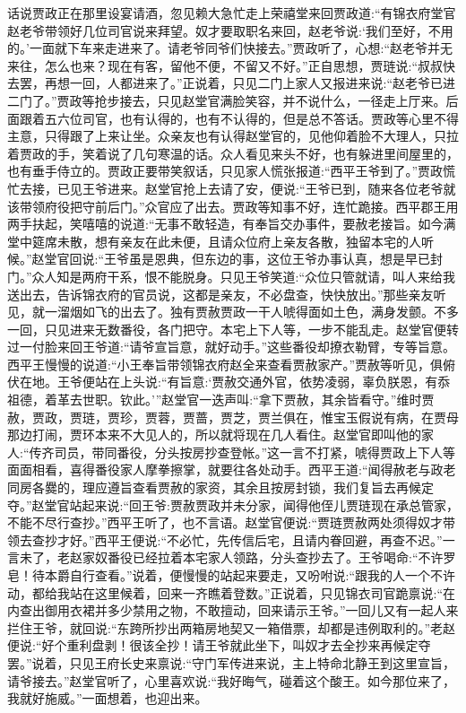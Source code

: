 


\begin{parag}
    话说贾政正在那里设宴请酒，忽见赖大急忙走上荣禧堂来回贾政道:“有锦衣府堂官赵老爷带领好几位司官说来拜望。奴才要取职名来回，赵老爷说:‘我们至好，不用的。’一面就下车来走进来了。请老爷同爷们快接去。”贾政听了，心想:“赵老爷并无来往，怎么也来？现在有客，留他不便，不留又不好。”正自思想，贾琏说:“叔叔快去罢，再想一回，人都进来了。”正说着，只见二门上家人又报进来说:“赵老爷已进二门了。”贾政等抢步接去，只见赵堂官满脸笑容，并不说什么，一径走上厅来。后面跟着五六位司官，也有认得的，也有不认得的，但是总不答话。贾政等心里不得主意，只得跟了上来让坐。众亲友也有认得赵堂官的，见他仰着脸不大理人，只拉着贾政的手，笑着说了几句寒温的话。众人看见来头不好，也有躲进里间屋里的，也有垂手侍立的。贾政正要带笑叙话，只见家人慌张报道:“西平王爷到了。”贾政慌忙去接，已见王爷进来。赵堂官抢上去请了安，便说:“王爷已到，随来各位老爷就该带领府役把守前后门。”众官应了出去。贾政等知事不好，连忙跪接。西平郡王用两手扶起，笑嘻嘻的说道:“无事不敢轻造，有奉旨交办事件，要赦老接旨。如今满堂中筵席未散，想有亲友在此未便，且请众位府上亲友各散，独留本宅的人听候。”赵堂官回说:“王爷虽是恩典，但东边的事，这位王爷办事认真，想是早已封门。”众人知是两府干系，恨不能脱身。只见王爷笑道:“众位只管就请，叫人来给我送出去，告诉锦衣府的官员说，这都是亲友，不必盘查，快快放出。”那些亲友听见，就一溜烟如飞的出去了。独有贾赦贾政一干人唬得面如土色，满身发颤。不多一回，只见进来无数番役，各门把守。本宅上下人等，一步不能乱走。赵堂官便转过一付脸来回王爷道:“请爷宣旨意，就好动手。”这些番役却撩衣勒臂，专等旨意。西平王慢慢的说道:“小王奉旨带领锦衣府赵全来查看贾赦家产。”贾赦等听见，俱俯伏在地。王爷便站在上头说:“有旨意:‘贾赦交通外官，依势凌弱，辜负朕恩，有忝祖德，着革去世职。钦此。’”赵堂官一迭声叫:“拿下贾赦，其余皆看守。”维时贾赦，贾政，贾琏，贾珍，贾蓉，贾蔷，贾芝，贾兰俱在，惟宝玉假说有病，在贾母那边打闹，贾环本来不大见人的，所以就将现在几人看住。赵堂官即叫他的家人:“传齐司员，带同番役，分头按房抄查登帐。”这一言不打紧，唬得贾政上下人等面面相看，喜得番役家人摩拳擦掌，就要往各处动手。西平王道:“闻得赦老与政老同房各爨的，理应遵旨查看贾赦的家资，其余且按房封锁，我们复旨去再候定夺。”赵堂官站起来说:“回王爷:贾赦贾政并未分家，闻得他侄儿贾琏现在承总管家，不能不尽行查抄。”西平王听了，也不言语。赵堂官便说:“贾琏贾赦两处须得奴才带领去查抄才好。”西平王便说:“不必忙，先传信后宅，且请内眷回避，再查不迟。”一言未了，老赵家奴番役已经拉着本宅家人领路，分头查抄去了。王爷喝命:“不许罗皂！待本爵自行查看。”说着，便慢慢的站起来要走，又吩咐说:“跟我的人一个不许动，都给我站在这里候着，回来一齐瞧着登数。”正说着，只见锦衣司官跪禀说:“在内查出御用衣裙并多少禁用之物，不敢擅动，回来请示王爷。”一回儿又有一起人来拦住王爷，就回说:“东跨所抄出两箱房地契又一箱借票，却都是违例取利的。”老赵便说:“好个重利盘剥！很该全抄！请王爷就此坐下，叫奴才去全抄来再候定夺罢。”说着，只见王府长史来禀说:“守门军传进来说，主上特命北静王到这里宣旨，请爷接去。”赵堂官听了，心里喜欢说:“我好晦气，碰着这个酸王。如今那位来了，我就好施威。”一面想着，也迎出来。
\end{parag}


